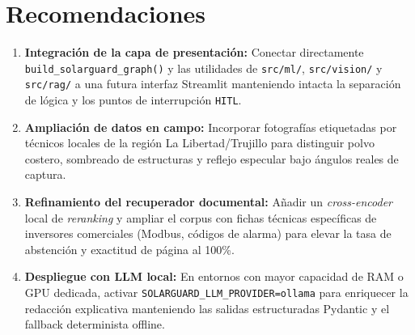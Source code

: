 \documentclass[12pt,a4paper]{article}
\begin{document}
\section{Recomendaciones}
\label{sec:recomendaciones}
\begin{enumerate}
    \item \textbf{Integración de la capa de presentación:} Conectar directamente \texttt{build\_solarguard\_graph()} y las utilidades de \texttt{src/ml/}, \texttt{src/vision/} y \texttt{src/rag/} a una futura interfaz Streamlit manteniendo intacta la separación de lógica y los puntos de interrupción \texttt{HITL}.
    \item \textbf{Ampliación de datos en campo:} Incorporar fotografías etiquetadas por técnicos locales de la región La Libertad/Trujillo para distinguir polvo costero, sombreado de estructuras y reflejo especular bajo ángulos reales de captura.
    \item \textbf{Refinamiento del recuperador documental:} Añadir un \textit{cross-encoder} local de \textit{reranking} y ampliar el corpus con fichas técnicas específicas de inversores comerciales (Modbus, códigos de alarma) para elevar la tasa de abstención y exactitud de página al 100\%.
    \item \textbf{Despliegue con LLM local:} En entornos con mayor capacidad de RAM o GPU dedicada, activar \texttt{SOLARGUARD\_LLM\_PROVIDER=ollama} para enriquecer la redacción explicativa manteniendo las salidas estructuradas Pydantic y el fallback determinista offline.
\end{enumerate}

\end{document}
